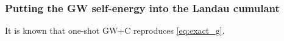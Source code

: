 \subsubsection{Putting the GW self-energy into the Landau cumulant}
 It is known that one-shot GW+C reproduces \ref{eq:exact_g}.
